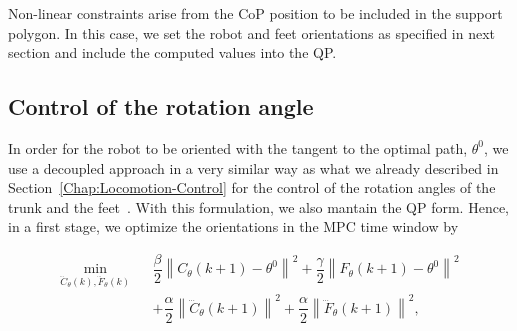 

Non-linear constraints arise from the CoP position to be included in the support polygon. In this case, we set the robot and feet orientations as specified in next section and include the computed values into the QP.

\subsection{Control of the rotation angle}
In order for the robot to be oriented with the tangent to the optimal path, $\theta^0$, we use a decoupled approach in a very similar way as what we already described in Section~\ref{Chap:Locomotion-Control} for the control of the rotation angles of the trunk and the feet~\citep{HerdtIROS2010}. With this formulation, we also mantain the QP form. Hence, in a first stage, we optimize the orientations in the MPC time window by  

\begin{eqnarray}
\nonumber
 \min\limits_{\dddot{C}_{\theta}(k),\dddot{F}_{\theta}(k)}  &&  \dfrac{\beta}{2} \left\| C_{\theta}(k+1) - \theta^{0} \right\|^2 + \dfrac{\gamma}{2} \left\| F_{\theta}(k+1) - \theta^{0} \right\|^2 \\
\nonumber && + \dfrac{\alpha}{2} \left\| \dddot{C}_{\theta}(k+1) \right\|^2 + \dfrac{\alpha}{2} \left\| \dddot{F}_{\theta}(k+1) \right\|^2,
\end{eqnarray}

